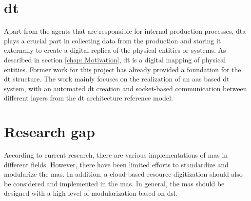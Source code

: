 \section{\gls{dt}}


Apart from the agents that are responsible for internal production 
processes, \gls{dta} plays a crucial part in collecting data from the 
production and storing it externally to create a digital replica of the 
physical entities or systems. As described in section \ref{chap: Motivation}, 
\gls{dt} is a digital mapping of physical entities. Former work for this 
project has already provided a foundation for the \gls{dt} 
structure\cite{hofgen_architecture_2023}. 
The work mainly focuses on the realization of an \gls{aas} based \gls{dt} system, 
with an automated \gls{dt} creation and socket-based communication between 
different layers from the \gls{dt} architecture reference 
model\cite[fig.5]{aheleroff_digital_2021}. 




\section{Research gap}

According to current research, there are various implementations of \gls{mas} in 
different fields. However, there have been limited efforts to standardize and 
modularize the \gls{mas}. In addition, a cloud-based resource digitization should also 
be considered and implemented in the \gls{mas}. In general, the \gls{mas} should be designed 
with a high level of modularization based on \gls{dsl}.

